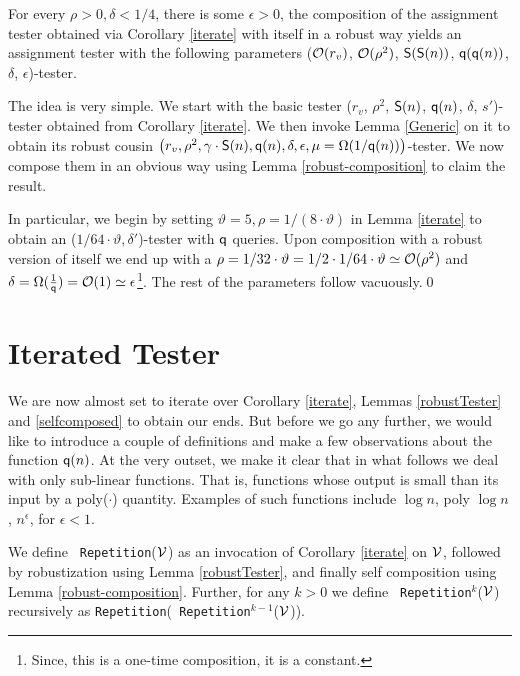 \begin{lemma}\label{selfcomposed}
  For every $\rho > 0, \delta < 1/4$, there is some $\epsilon > 0$,
  the composition of the assignment tester obtained via Corollary \ref{iterate} with
 itself in a robust way yields an assignment tester with the following 
parameters (${\cal O}(r_v)$, ${\cal O}(\rho^2)$, ${\sf S}({\sf S}(n))$, ${\sf q}({\sf q}(n))$, $\delta$, $\epsilon$)-tester.
\end{lemma}
 The idea is very simple. We start with the basic tester
($r_v$, $\rho^2$, ${\sf S}(n)$, ${\sf q}(n)$, $\delta$, $s'$)-tester obtained from Corollary \ref{iterate}. 
We then invoke Lemma \ref{Generic} on it to obtain its robust cousin 
$\left(r_v, \rho^2, \gamma \cdot {\sf S}(n), {\sf q}(n), \delta, \epsilon, \mu =
  \Omega(1/{\sf q}(n))\right)$-tester. We now compose them in an obvious 
way using Lemma \ref{robust-composition} to claim the result. 

In particular, we begin by setting $\vartheta = 5, \rho = 1/( 8 \cdot \vartheta)$ in Lemma \ref{iterate} to
obtain an ($1/64 \cdot \vartheta, \delta'$)-tester with ${\sf q}$ queries.  Upon
composition with a robust version of itself we end up with a $\rho = 1/32
\cdot \vartheta = 1/2 \cdot 1/64 \cdot \vartheta \simeq {\cal O}(\rho^2)$
and $\delta = \Omega(\frac{1}{{\sf q}}) = {\cal O}(1) \simeq \epsilon$\footnote{Since, this is a
  one-time composition, it is a constant.}. The rest of
the parameters follow vacuously.\qed 

\section{Iterated Tester}

We are now almost set to iterate over Corollary \ref{iterate}, Lemmas \ref{robustTester} and
\ref{selfcomposed} to obtain our ends. But before we go any further, we would
like to introduce a couple of definitions and make a few
observations about the function ${{\sf q}}(n)$. At the
very outset, we make it clear that in what follows we deal with only
sub-linear functions. That is, functions whose output is
small than its input by a {\sf poly}($\cdot$) quantity. Examples 
of such functions include $\log n$, {\sf
  poly} $\log n$, $n^\epsilon$, for $\epsilon < 1$.

\begin{definition}[{\tt Repetition}] \label{repetition} We define {\tt
    Repetition}(${\cal V}$) as an invocation of Corollary \ref{iterate} on
  ${\cal V}$, followed by robustization using Lemma
  \ref{robustTester}, and finally self composition using Lemma
  \ref{robust-composition}. Further, for any $k > 0$ we define {\tt
    Repetition}$^{k}$(${\cal V}$) recursively as {\tt Repetition}({\tt
    Repetition}$^{k-1}$(${\cal V}$)).
\end{definition}



